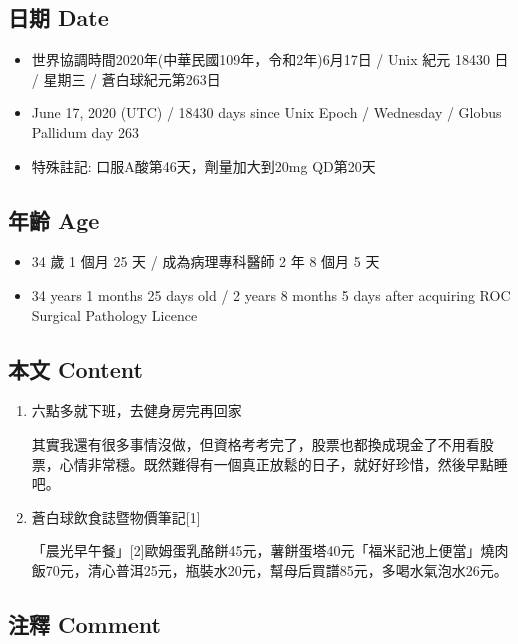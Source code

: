 \documentclass[
]{article}
\providecommand{\tightlist}{%
  \setlength{\itemsep}{0pt}\setlength{\parskip}{0pt}}
\begin{document}
\hypertarget{ux65e5ux671f-date-14}{%
\subsection{日期 Date}\label{ux65e5ux671f-date-14}}

\begin{itemize}
\tightlist
\item
  世界協調時間2020年(中華民國109年，令和2年)6月17日 / Unix 紀元 18430 日
  / 星期三 / 蒼白球紀元第263日
\item
  June 17, 2020 (UTC) / 18430 days since Unix Epoch / Wednesday / Globus
  Pallidum day 263
\item
  特殊註記: 口服A酸第46天，劑量加大到20mg QD第20天
\end{itemize}

\hypertarget{ux5e74ux9f61-age-14}{%
\subsection{年齡 Age}\label{ux5e74ux9f61-age-14}}

\begin{itemize}
\tightlist
\item
  34 歲 1 個月 25 天 / 成為病理專科醫師 2 年 8 個月 5 天
\item
  34 years 1 months 25 days old / 2 years 8 months 5 days after
  acquiring ROC Surgical Pathology Licence
\end{itemize}

\hypertarget{ux672cux6587-content-14}{%
\subsection{本文 Content}\label{ux672cux6587-content-14}}

\begin{enumerate}
\def\labelenumi{\arabic{enumi}.}
\item
  六點多就下班，去健身房完再回家

  其實我還有很多事情沒做，但資格考考完了，股票也都換成現金了不用看股票，心情非常穩。既然難得有一個真正放鬆的日子，就好好珍惜，然後早點睡吧。
\item
  蒼白球飲食誌暨物價筆記{[}1{]}

  「晨光早午餐」{[}2{]}歐姆蛋乳酪餅45元，薯餅蛋塔40元「福米記池上便當」燒肉飯70元，清心普洱25元，瓶裝水20元，幫母后買譜85元，多喝水氣泡水26元。
\end{enumerate}

\hypertarget{ux6ce8ux91cb-comment-14}{%
\subsection{注釋 Comment}\label{ux6ce8ux91cb-comment-14}}
\end{document}

